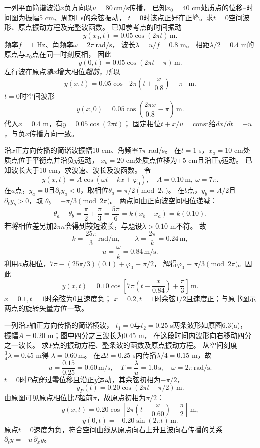 
\problemtext 一列平面简谐波沿$x$负方向以$u=80\,\mathrm{cm/s}$传播，
已知$x_0=40$ cm处质点的位移--时间图为振幅5 cm、周期1 s的余弦振动，
$t=0$时该点正好在正峰。求$t=0$空间波形、原点振动方程及完整波函数。
\workings
已知参考点的时间振动
\[
y(x_0,t)=0.05\cos(2\pi t)\,\mathrm m.
\]
频率$f=1$ Hz、角频率$\omega=2\pi\,\mathrm{rad/s}$，
波长$\lambda=u/f=0.8$ m。
相距$\lambda/2=0.4$ m的原点与$x_0$点在同一时刻反相，
因此
\[
\boxed{y(0,t)=0.05\cos(2\pi t-\pi)\,\mathrm m}.
\]
左行波在原点随$x$增大相位\emph{超前}，所以
\[
\boxed{y(x,t)=0.05\cos\left[2\pi\left(t+\frac{x}{0.8}\right)-\pi\right]\,\mathrm m}.
\]
$t=0$时空间波形
\[
\boxed{y(x,0)=0.05\cos\left(\frac{2\pi x}{0.8}-\pi\right)\,\mathrm m}.
\]
\crosscheck 代入$x=0.4$ m，有$y=0.05\cos(2\pi t)$；
固定相位$t+x/u=\mathrm{const}$给$dx/dt=-u$，与负$x$传播方向一致。

\problemtext 沿$x$正方向传播的简谐波振幅10 cm、角频率$7\pi$ rad/s。
在$t=1$ s，$x_a=10$ cm处质点位于平衡点并沿负$y$运动，
$x_b=20$ cm处质点位移为$+5$ cm且沿正$y$运动。
已知波长大于10 cm，求波速、波长及波函数。
\workings
令
\[
y(x,t)=A\cos\left(\omega t-kx+\varphi_0\right),
\quad A=0.10\,\mathrm m,\ \omega=7\pi.
\]
在$a$点，$y_a=0$且$\partial_ty_a<0$，取相位$\theta_a=\pi/2\pmod{2\pi}$。
在$b$点，$y_b=A/2$且$\partial_ty_b>0$，取
$\theta_b=-\pi/3\pmod{2\pi}$。
两点间由正向波空间相位递减：
\[
\theta_a-\theta_b=\frac\pi2+\frac\pi3=\frac{5\pi}{6}
=k(x_b-x_a)=k(0.10).
\]
若将相位差另加$2\pi n$会得到较短波长，与题设$\lambda>0.10$ m不符。
故
\[
\boxed{k=\frac{25\pi}{3}\,\mathrm{rad/m}},\qquad
\boxed{\lambda=\frac{2\pi}{k}=0.24\,\mathrm m},
\]
\[
\boxed{u=\frac{\omega}{k}=0.84\,\mathrm{m/s}}.
\]
利用$a$点相位，$7\pi-(25\pi/3)(0.1)+\varphi_0\equiv\pi/2$，
解得$\varphi_0\equiv\pi/3\pmod{2\pi}$。因此
\[
\boxed{y(x,t)=0.10\cos\left[7\pi
\left(t-\frac{x}{0.84}\right)+\frac\pi3\right]\,\mathrm m}.
\]
\crosscheck $x=0.1,t=1$时余弦为0且速度负；
$x=0.2,t=1$时余弦$1/2$且速度正；与原书图示两点的旋转矢量方位一致。

\problemtext 一列沿$x$轴正方向传播的简谐横波，
$t_1=0$与$t_2=0.25$ s两条波形如原图6.3(a)，
振幅$A=0.20$ m；图中四分之三波长为0.45 m，
在这段时间内波形向右移动四分之一波长。
求$P$点的振动方程、整条波的函数及原点振动方程。
\workings
从空间刻度
$\frac34\lambda=0.45$ m得
$\boxed{\lambda=0.60\,\mathrm m}$。
在$\Delta t=0.25$ s内传播$\lambda/4=0.15$ m，故
\[
\boxed{u=\frac{0.15}{0.25}=0.60\,\mathrm{m/s}},
\quad
\boxed{T=\frac\lambda u=1.0\,\mathrm s},
\quad\omega=2\pi\,\mathrm{rad/s}.
\]
$t=0$时$P$点穿过零位移且沿正$y$运动，其余弦初相为$-\pi/2$，
\[
\boxed{y_P(t)=0.20\cos(2\pi t-\pi/2)\,\mathrm m}.
\]
由原图可见原点相位比$P$超前$\pi$，故原点初相为$\pi/2$：
\[
\boxed{y(x,t)=0.20\cos\left[
2\pi\left(t-\frac{x}{0.60}\right)+\frac\pi2\right]\,\mathrm m},
\]
\[
\boxed{y(0,t)=-0.20\sin(2\pi t)\,\mathrm m}.
\]
\crosscheck 原点$t=0$速度为负，符合空间曲线从原点向右上升且波向右传播的关系
$\partial_t y=-u\,\partial_x y$。

